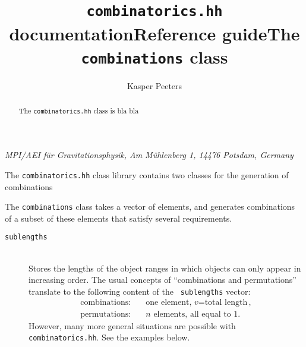 \documentclass[11pt]{kasper}
\begin{document}
\title{{\tt combinatorics.hh} documentation}
\author{Kasper Peeters}
\address{1}{{\it MPI/AEI f\"ur Gravitationsphysik, Am M\"uhlenberg 1, 14476
Potsdam, Germany}}
\maketitle
\begin{abstract}
The {\tt combinatorics.hh} class is bla bla
\end{abstract}

\begin{sectionunit}
\title{Reference guide}
\maketitle
The {\tt combinatorics.hh} class library contains two classes for the
generation of combinations
\begin{sectionunit}
\title{The {\tt combinations} class}
\maketitle
The {\tt combinations} class takes a vector of elements, and generates
combinations of a subset of these elements that satisfy several 
requirements. 
\begin{description}
\item[{\tt sublengths}]~\\
Stores the lengths of the object ranges in which objects can only
appear in increasing order. The usual concepts of ``combinations and
permutations'' translate to the following content of the {\tt
sublengths} vector:
\begin{equation}
\begin{aligned}
\text{combinations:} &\quad \text{one element, $v$=total length}\, ,\\
\text{permutations:} &\quad \text{$n$ elements, all equal to $1$}.
\end{aligned}
\end{equation}
However, many more general situations are possible with {\tt
  combinatorics.hh}. See the examples below.


\end{description}
\end{sectionunit}
\end{sectionunit}
\end{document}
